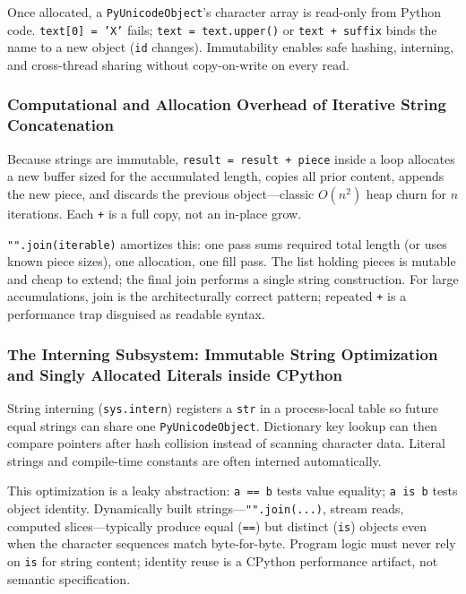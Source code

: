 Once allocated, a \texttt{PyUnicodeObject}'s character array is read-only from Python code. \texttt{text[0] = 'X'} fails; \texttt{text = text.upper()} or \texttt{text + suffix} binds the name to a new object (\texttt{id} changes). Immutability enables safe hashing, interning, and cross-thread sharing without copy-on-write on every read.

\subsubsection{Computational and Allocation Overhead of Iterative String Concatenation}

Because strings are immutable, \texttt{result = result + piece} inside a loop allocates a new buffer sized for the accumulated length, copies all prior content, appends the new piece, and discards the previous object---classic $O(n^2)$ heap churn for $n$ iterations. Each \texttt{+} is a full copy, not an in-place grow.

\texttt{"".join(iterable)} amortizes this: one pass sums required total length (or uses known piece sizes), one allocation, one fill pass. The list holding pieces is mutable and cheap to extend; the final join performs a single string construction. For large accumulations, join is the architecturally correct pattern; repeated \texttt{+} is a performance trap disguised as readable syntax.

\subsubsection{The Interning Subsystem: Immutable String Optimization and Singly Allocated Literals inside CPython}

String interning (\texttt{sys.intern}) registers a \texttt{str} in a process-local table so future equal strings can share one \texttt{PyUnicodeObject}. Dictionary key lookup can then compare pointers after hash collision instead of scanning character data. Literal strings and compile-time constants are often interned automatically.

This optimization is a leaky abstraction: \texttt{a == b} tests value equality; \texttt{a is b} tests object identity. Dynamically built strings---\texttt{"".join(...)}, stream reads, computed slices---typically produce equal (\texttt{==}) but distinct (\texttt{is}) objects even when the character sequences match byte-for-byte. Program logic must never rely on \texttt{is} for string content; identity reuse is a CPython performance artifact, not semantic specification.
